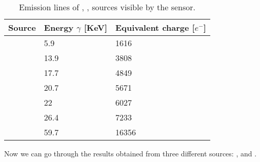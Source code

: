 \begin{table}[h!]
\centering
\begin{tabular}{C{3cm}|C{2.8cm}|C{2.8cm}}
\hline
Source & Energy $\gamma$ [KeV] & Equivalent charge [$e^{-}$]\\[2ex]
\hline
\hline
{} & 5.9 & 1616\\[0.5ex]
\hline
{} & 13.9 & 3808\\[0.5ex]
\hline
{} & 17.7 & 4849\\[0.5ex]
\hline
{} & 20.7 & 5671\\[0.5ex]
\hline
{} & 22 & 6027\\[0.5ex]
\hline
{} & 26.4 & 7233\\[0.5ex]
\hline
{} & 59.7 & 16356\\
\hline
\hline
\end{tabular}
\caption{Emission lines of , ,  sources visible by the sensor.}
\label{tab:radio_sources}
\end{table}


Now we can go through the results obtained from three different sources: ,  and .
\subsection{}

